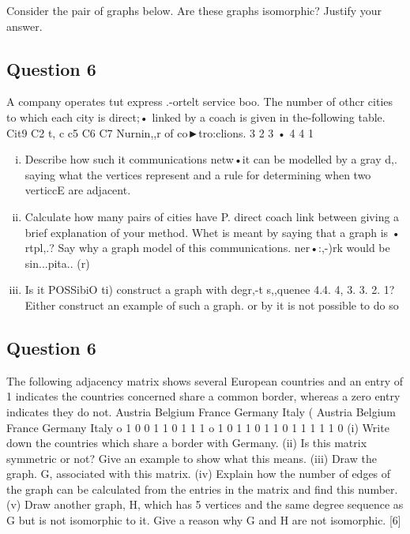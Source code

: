 ﻿
\item  Consider the pair of graphs below. Are these graphs isomorphic? Justify your answer.


\subsection{Question 6} A company operates tut express .-ortelt service boo.%
The number of othcr cities to which each city is direct;• linked by a coach is given in the-following table. 
Cit9 
C2 t, c c5 C6 C7 
Nurnin,,r of co►tro:clions. 3 2 3 • 
4 
4 
1 
\begin{enumerate}[(i)]
\item Describe how such it communications netw•it can be modelled by a gray d,. saying what the vertices represent and a rule for determining when two verticcE are adjacent. 
\item  Calculate how many pairs of cities have P. direct coach link between giving a brief explanation of your method. Whet is meant by saying that a graph is • rtpl,.? Say why a graph model of this communications. ner•:,-)rk would be sin...pita.. 
(r) 
\item  Is it POSSibiO ti) construct a graph with degr,-t s,,quenee 4.4. 4, 3. 3. 2. 1? Either construct an example of such a graph. or by it is not possible to do so 
\end{enumerate}
\subsection{Question 6}
 The following adjacency matrix shows several European countries and an entry of 1 indicates the countries concerned share a common border, whereas a zero entry indicates they do not. 
Austria Belgium France Germany Italy 
( 
Austria Belgium France Germany Italy o 1 0 0 1 1 0 1 1 1 o 1 0 1 1 0 1 1 0 1 1 1 1 1 0 
(i) Write down the countries which share a border with Germany. (ii) Is this matrix symmetric or not? Give an example to show what this means. (iii) Draw the graph. G, associated with this matrix. (iv) Explain how the number of edges of the graph can be calculated from the entries in the matrix and find this number. (v) Draw another graph, H, which has 5 vertices and the same degree sequence as G but is not isomorphic to it. Give a reason why G and H are not isomorphic. [6] 









